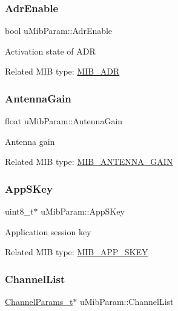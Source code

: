 \subsubsection{\texorpdfstring{Adr\+Enable}{AdrEnable}}
{\footnotesize\ttfamily bool u\+Mib\+Param\+::\+Adr\+Enable}

Activation state of A\+DR

Related M\+IB type\+: \hyperlink{group__LORAMAC_gga32ea83d13a3f5bb4b3ec2ace2319ab61a756ff0b66217e3e4ddd0442c8aa56802}{M\+I\+B\+\_\+\+A\+DR} \mbox{\label{unionuMibParam_a294b81422b95e51abf8dbaf10da230e2}} 
\subsubsection{\texorpdfstring{Antenna\+Gain}{AntennaGain}}
{\footnotesize\ttfamily float u\+Mib\+Param\+::\+Antenna\+Gain}

Antenna gain

Related M\+IB type\+: \hyperlink{group__LORAMAC_gga32ea83d13a3f5bb4b3ec2ace2319ab61a268b2f7da53dbc25655a7bdcc7e6128e}{M\+I\+B\+\_\+\+A\+N\+T\+E\+N\+N\+A\+\_\+\+G\+A\+IN} \mbox{\label{unionuMibParam_aa457344123276ddc04277da5208175ed}} 
\subsubsection{\texorpdfstring{App\+S\+Key}{AppSKey}}
{\footnotesize\ttfamily uint8\+\_\+t$\ast$ u\+Mib\+Param\+::\+App\+S\+Key}

Application session key

Related M\+IB type\+: \hyperlink{group__LORAMAC_gga32ea83d13a3f5bb4b3ec2ace2319ab61ae65b7c035d9969666eb5e26a2b3c19fd}{M\+I\+B\+\_\+\+A\+P\+P\+\_\+\+S\+K\+EY} \mbox{\label{unionuMibParam_af3b0b4ded686920d7494d6ea0ec80700}} 
\subsubsection{\texorpdfstring{Channel\+List}{ChannelList}}
{\footnotesize\ttfamily \hyperlink{group__LORAMAC_ga1360ca6f82c6d125ea43a9dad9b56184}{Channel\+Params\+\_\+t}$\ast$ u\+Mib\+Param\+::\+Channel\+List}

